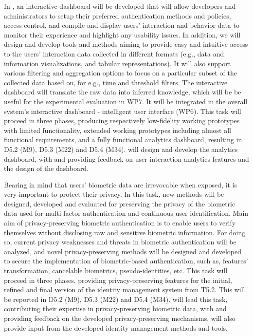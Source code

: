 \begin{Workpackage}{\thewpno}
\begin{Task}
In \theTask, an interactive dashboard will be developed that will allow developers and administrators to setup their preferred authentication methods and policies, access control, and compile and display users’ interaction and behavior data to monitor their experience and highlight any usability issues. In addition, we will design and develop tools and methods aiming to provide easy and intuitive access to the users’ interaction data collected in different formats (e.g., data and information visualizations, and tabular representations). It will also support various filtering and aggregation options to focus on a particular subset of the collected data based on, for e.g., time and threshold filters. The interactive dashboard will translate the raw data into inferred knowledge, which will be be useful for the experimental evaluation in WP7. It will be integrated in the overall system's interactive dashboard - intelligent user interface (WP6). This task will proceed in three phases, producing respectively low-fidelity working prototypes with limited functionality, extended working prototypes including almost all functional requirements, and a fully functional analytics dashboard, resulting in D5.2 (M9), D5.3 (M22) and D5.4 (M34). \COGNIshort{} will design and develop the analytics dashboard, with \SCCHshort{} and \FRQshort{} providing feedback on user interaction analytics features and the design of the dashboard.
\end{Task}

\begin{Task}
\TaskResults{%
\ref{del:auth2},
\ref{del:auth3},
\ref{del:auth4}
}
\TaskHeader{}
Bearing in mind that users' biometric data are irrevocable when exposed, it is very important to protect their privacy. In this task, new methods will be designed, developed and evaluated for preserving the privacy of the biometric data used for multi-factor authentication and continuous user identification. Main aim of privacy-preserving biometric authentication is to enable users to verify themselves without disclosing raw and sensitive biometric information. For doing so, current privacy weaknesses and threats in biometric authentication will be analyzed, and novel privacy-preserving methods will be designed and developed to secure the implementation of biometric-based authentication, such as, features' transformation, cancelable biometrics, pseudo-identities, etc. This task will proceed in three phases, providing privacy-preserving features for the initial, refined and final version of the identity management system from T5.2. This will be reported in D5.2 (M9), D5.3 (M22) and D5.4 (M34). \UODshort{} will lead this task, contributing their expertise in privacy-preserving biometric data, with \FRQshort{} and \COGNIshort{} providing feedback on the developed privacy-preserving mechanisms. \COGNIshort{} will also provide input from the developed identity management methods and tools.
\end{Task}



\end{Workpackage}
